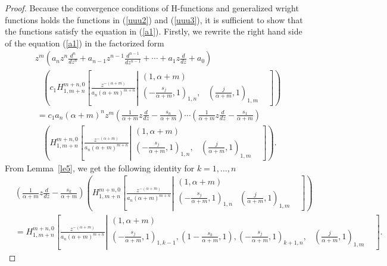 \documentclass[12pt]{article}
\theoremstyle{definition}
\begin{document}
\begin{proof}
Because the convergence
conditions of H-functions and generalized wright functions holds the functions in (\ref{uuu2}) and (\ref{uuu3}), it is sufficient to show that the functions satisfy the equation in (\ref{a1}).
Firstly, we rewrite the right hand side of the equation (\ref{a1}) in the factorized form
\begin{align}\label{uuu5}
    & z^{m}\left(a_nz^n\frac{d^n}{dz^n}+a_{n-1}z^{n-1}\frac{d^{n-1}}{dz^{n-1}}+\cdots+ a_1z\frac{d}{dz} +a_0\right)\nonumber\\
    &~~~~\left( c_1H_{1,m+n}^{m+n,0} \left[ \frac{z^{-(\alpha+m)}}{a_n(\alpha+m)^{m+n}} \left| \begin{matrix}
( 1 , \alpha+m )  \\
 \left( -\frac{s_j}{\alpha+m} , 1 \right)_{1,n}, & \left(\frac{j}{\alpha+m} , 1  \right)_{1,m} &  \end{matrix}\right.\right]\right)\nonumber\\ 
    &~=c_1a_n(\alpha+m)^n z^m\left(\frac{1}{\alpha+m}z\frac{d}{dz}-\frac{s_n}{\alpha+m}\right)\cdots\left(\frac{1}{\alpha+m}z\frac{d}{dz}-\frac{s_1}{\alpha+m}\right)\nonumber\\
    & ~~~~\left( H_{1,m+n}^{m+n,0} \left[ \frac{z^{-(\alpha+m)}}{a_n(\alpha+m)^{m+n}} \left| \begin{matrix}
( 1 , \alpha+m )  \\
 \left( -\frac{s_j}{\alpha+m} , 1 \right)_{1,n}, & \left(\frac{j}{\alpha+m} , 1  \right)_{1,m} &  \end{matrix}\right.\right]\right).
\end{align}
From Lemma~\ref{le5}, we get the following identity for $k=1,\ldots, n$
\begin{align*}
& \left(\frac{1}{\alpha+m}z\frac{d}{dz}-\frac{s_k}{\alpha+m}\right)\left(H_{1,m+n}^{m+n,0} \left[ \frac{z^{-(\alpha+m)}}{a_n(\alpha+m)^{m+n}} \left| \begin{matrix}
( 1 , \alpha+m )  \\
\left( -\frac{s_j}{\alpha+m} , 1 \right)_{1,n}& \left(\frac{j}{\alpha+m} , 1  \right)_{1,m} &  \end{matrix}\right.\right]\right)\\
&=H_{1,m+n}^{m+n,0} \left[ \frac{z^{-(\alpha+m)}}{a_n(\alpha+m)^{m+n}} \left| \begin{matrix}
( 1 , \alpha+m )  \\
\left( -\frac{s_j}{\alpha+m} , 1 \right)_{1,k-1}, \left(1 -\frac{s_k}{\alpha+m} , 1 \right), \left( -\frac{s_j}{\alpha+m} , 1 \right)_{k+1,n}, & \left(\frac{j}{\alpha+m} , 1  \right)_{1,m} &  \end{matrix}\right.\right].

\end{align*}
\end{proof}
\end{document}
